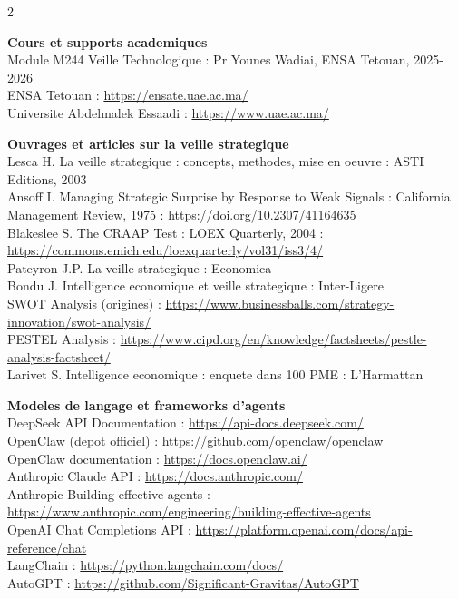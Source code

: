 \documentclass[12pt,a4paper,openany]{report}
\begin{document}
\vspace{0.4cm}

\begin{multicols}{2}
\raggedright
\sffamily\small

\textbf{\color{ensaBlue}Cours et supports academiques}\\
Module M244 Veille Technologique : Pr Younes Wadiai, ENSA Tetouan, 2025-2026\\
ENSA Tetouan : \url{https://ensate.uae.ac.ma/}\\
Universite Abdelmalek Essaadi : \url{https://www.uae.ac.ma/}

\vspace{0.3cm}

\textbf{\color{ensaBlue}Ouvrages et articles sur la veille strategique}\\
Lesca H. \og La veille strategique : concepts, methodes, mise en oeuvre \fg{} : ASTI Editions, 2003\\
Ansoff I. \og Managing Strategic Surprise by Response to Weak Signals \fg{} : California Management Review, 1975 : \url{https://doi.org/10.2307/41164635}\\
Blakeslee S. \og The CRAAP Test \fg{} : LOEX Quarterly, 2004 : \url{https://commons.emich.edu/loexquarterly/vol31/iss3/4/}\\
Pateyron J.P. \og La veille strategique \fg{} : Economica\\
Bondu J. \og Intelligence economique et veille strategique \fg{} : Inter-Ligere\\
SWOT Analysis (origines) : \url{https://www.businessballs.com/strategy-innovation/swot-analysis/}\\
PESTEL Analysis : \url{https://www.cipd.org/en/knowledge/factsheets/pestle-analysis-factsheet/}\\
Larivet S. \og Intelligence economique : enquete dans 100 PME \fg{} : L'Harmattan

\vspace{0.3cm}

\textbf{\color{ensaBlue}Modeles de langage et frameworks d'agents}\\
DeepSeek API Documentation : \url{https://api-docs.deepseek.com/}\\
OpenClaw (depot officiel) : \url{https://github.com/openclaw/openclaw}\\
OpenClaw documentation : \url{https://docs.openclaw.ai/}\\
Anthropic Claude API : \url{https://docs.anthropic.com/}\\
Anthropic \og Building effective agents \fg{} : \url{https://www.anthropic.com/engineering/building-effective-agents}\\
OpenAI Chat Completions API : \url{https://platform.openai.com/docs/api-reference/chat}\\
LangChain : \url{https://python.langchain.com/docs/}\\
AutoGPT : \url{https://github.com/Significant-Gravitas/AutoGPT}


\end{multicols}
\end{document}
